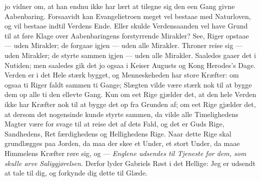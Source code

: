 \documentclass[12pt,a4paper]{book}
\begin{document}
jo vidner om, at han endnu ikke har lært at tilegne sig den een Gang
givne Aabenbaring. Forsaavidt kan Evangelietroen meget vel bestaae med
Naturloven, og vil bestaae indtil Verdens Ende. Eller skulde
Verdensaanden vel have Grund til at føre Klage over Aabenbaringens
forstyrrende Mirakler? See, Riger opstaae --- uden Mirakler; de forgaae
igjen --- uden alle Mirakler. Throner reise sig --- uden Mirakler; de
styrte sammen igjen --- uden alle Mirakler. Saaledes gaaer det i
Nutiden; men saaledes gik det jo ogsaa i Keiser Augusts og Kong
Herodes's Dage. Verden er i det Hele stærk bygget, og Menneskeheden har
store Kræfter: om ogsaa ti Riger faldt sammen ti Gange; Slægten vilde
være stærk nok til at bygge dem op alle ti den ellevte Gang. Kun om eet
Rige gjælder det, at den hele Verden ikke har Kræfter nok til at bygge
det op fra Grunden af; om eet Rige gjælder det, at dersom det nogensinde
kunde styrte sammen, da vilde alle Timelighedens Magter være for svage
til at reise det af dets Fald, og det er Guds Rige, Sandhedens, Ret\-%
færdighedens og Hellighedens Rige. Naar dette Rige skal grundlægges paa
Jorden, da maa der skee et Under, et stort Under, da maae Himmelens
Kræfter røre sig, og ---
\emph{Englene udsendes til Tjeneste for dem, som skulle arve
Saliggjørelsen.} Derfor lyder Gabriels Røst i det Hellige: {\large Jeg er
udsendt at tale til dig, og forkynde dig dette til Glæde.}
\end{document}
